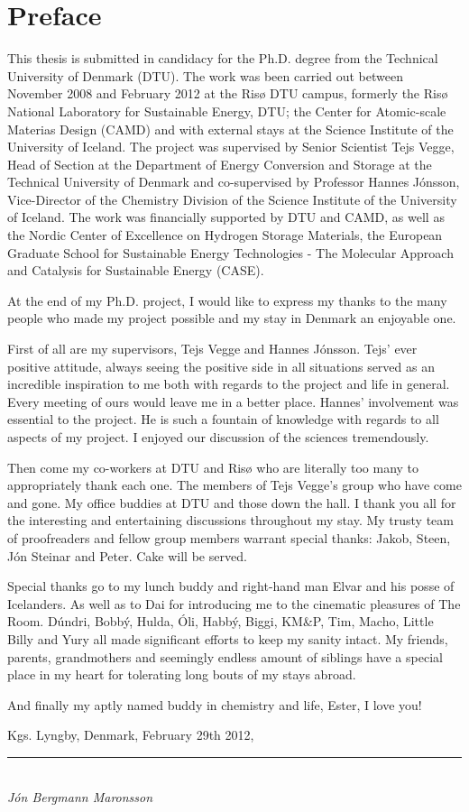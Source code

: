 \section*{Preface}

This thesis is submitted in candidacy for the Ph.D. degree from the Technical University of Denmark (DTU).
The work was been carried out between November 2008 and February 2012 at the Ris\o{} DTU campus, formerly the Ris\o{} National Laboratory for Sustainable Energy, DTU; the Center for Atomic-scale Materias Design (CAMD) and with external stays at the Science Institute of the University of Iceland.
The project was supervised by Senior Scientist Tejs Vegge, Head of Section at the Department of Energy Conversion and Storage at the Technical University of Denmark and co-supervised by Professor Hannes J\'onsson, Vice-Director of the Chemistry Division of the Science Institute of the University of Iceland.
The work was financially supported by DTU and CAMD, as well as the Nordic Center of Excellence on Hydrogen Storage Materials, the European Graduate School for Sustainable Energy Technologies - The Molecular Approach and Catalysis for Sustainable Energy (CASE).

\vspace{1em}

At the end of my Ph.D. project, I would like to express my thanks to the many people who made my project possible and my stay in Denmark an enjoyable one.

First of all are my supervisors, Tejs Vegge and Hannes J\'onsson.
Tejs' ever positive attitude, always seeing the positive side in all situations served as an incredible inspiration to me both with regards to the project and life in general.
Every meeting of ours would leave me in a better place.
Hannes' involvement was essential to the project.
He is such a fountain of knowledge with regards to all aspects of my project.
I enjoyed our discussion of the sciences tremendously.

Then come my co-workers at DTU and Ris\o{} who are literally too many to appropriately thank each one.
The members of Tejs Vegge's group who have come and gone.
My office buddies at DTU and those down the hall.
I thank you all for the interesting and entertaining discussions throughout my stay.
My trusty team of proofreaders and fellow group members warrant special thanks: Jakob, Steen, J\'on Steinar and Peter.
Cake will be served.

Special thanks go to my lunch buddy and right-hand man Elvar and his posse of Icelanders.
As well as to Da\dh{}i for introducing me to the cinematic pleasures of The Room.
D\'undri, Bobb\'y, Hulda, \'Oli, Habb\'y, Biggi, KM\&P, Tim, Macho, Little Billy and  Yury all made significant efforts to keep my sanity intact.
My friends, parents, grandmothers and seemingly endless amount of siblings have a special place in my heart for tolerating long bouts of my stays abroad.

And finally my aptly named buddy in chemistry and life, Ester, I love you!

\vspace{1em}
\begin{flushright}
Kgs. Lyngby, Denmark, February 29th 2012,\\

\vspace{2em}

\rule{50mm}{0.1pt}\\
\textit{J\'on Bergmann Maronsson}
\end{flushright}
